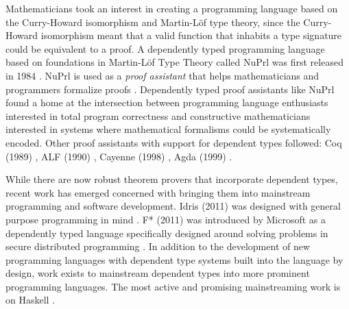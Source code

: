 Mathematicians took an interest in creating a programming language based on the
Curry-Howard isomorphism and Martin-L\"{o}f type theory, since the Curry-Howard
isomorphism meant that a valid function that inhabits a type signature could be
equivalent to a proof. A dependently typed programming language based on
foundations in Martin-L\"{o}f Type Theory called NuPrl was first released in
1984 \cite{nuprl}. NuPrl is used as a \textit{proof assistant} that helps
mathematicians and programmers formalize proofs \cite{nuprl}. Dependently typed
proof assistants like NuPrl found a home at the intersection between programming
language enthusiasts interested in total program correctness and constructive
mathematicians interested in systems where mathematical formalisms could be
systematically encoded. Other proof assistants with support for dependent types
followed: Coq (1989) \cite{coquand1988calculus}, ALF (1990) \cite{alf}, Cayenne
(1998) \cite{nuprl}, Agda (1999) \cite{norell:thesis}.

While there are now robust theorem provers that incorporate dependent types,
recent work has emerged concerned with bringing them into mainstream programming
and software development. Idris (2011) was designed with general purpose
programming in mind \cite{tdd_book}. F* (2011) was introduced by Microsoft as a
dependently typed language specifically designed around solving problems in
secure distributed programming \cite{fstar_distributed_programming}. In addition
to the development of new programming languages with dependent type systems
built into the language by design, work exists to mainstream dependent types
into more prominent programming languages. The most active and promising
mainstreaming work is on Haskell \cite{eisenberg2016,gundry2013}. 
